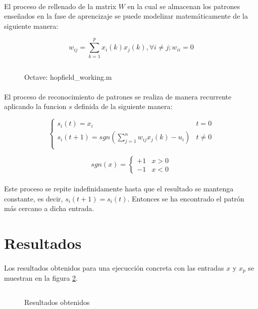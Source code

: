 \documentclass[10pt, a4paper,spanish]{article}
\begin{document}
		\paragraph{}
		El proceso de rellenado de la matrix $W$ en la cual se almacenan los patrones enseñados en la fase de aprencizaje se puede modelizar matemáticamente de la siguiente manera:

		\begin{equation}
			w_{ij} = \sum_{k=1}^{p} x_i(k)x_j(k), \forall i \neq j; w_{ii} = 0
		\end{equation}

		\begin{figure}[H]
			\centering
			\inputminted{octave}{../src/hopfield_working.m}
			\caption{Octave: hopfield\_working.m}
			\label{code:working}
		\end{figure}

		\paragraph{}
		El proceso de reconocimiento de patrones se realiza de manera recurrente aplicando la funcion $s$ definida de la siguiente manera:

		\begin{equation}
		 \begin{cases}
      	s_i(t) = x_i & t = 0 \\
      	s_i(t+1) = sgn(\sum_{j=1}^{n} w_{ij}x_{j}(k) - u_{i}) & t \neq 0 \\
   		\end{cases}
		\end{equation}

		\begin{equation}
			sgn(x) =
			\begin{cases}
				+1 & x > 0 \\
				-1 & x < 0
			\end{cases}
		\end{equation}

		\paragraph{}
		Este proceso se repite indefinidamente hasta que el resultado se mantenga constante, es decir, $s_i(t+1) = s_i(t)$. Entonces se ha encontrado el patrón más cercano a dicha entrada.


	\section{Resultados}

		\paragraph{}
		Los resultados obtenidos para una ejecucción concreta con las entradas $x$ y $x_p$ se muestran en la figura \ref{results}.

		\begin{figure}[H]
			\centering
			\inputminted{bash}{../output.txt}
			\caption{Resultados obtenidos}
			\label{results}

		\end{figure}
\end{document}
